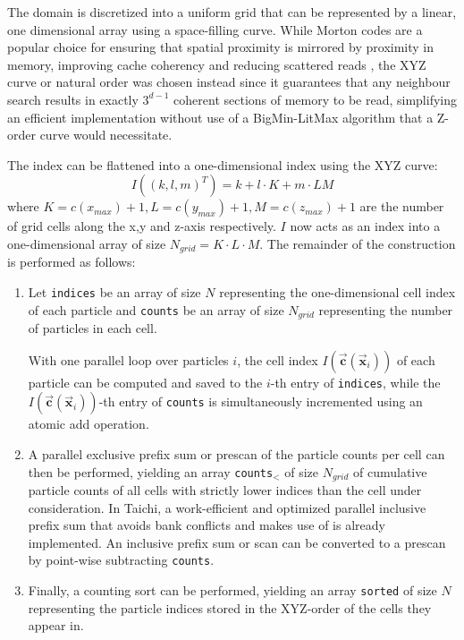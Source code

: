 \documentclass[oneside, a4paper]{book}
\newcommand\vek[1]{\vec{\bm{#1}}}
\newcommand\br[1]{\left(#1\right)}
\begin{document}
\begin{appendices}
    The domain is discretized into a uniform grid that can be represented by a linear, one dimensional array using a space-filling curve. While Morton codes are a popular choice \autocite{compressed-neighbour-lists} for ensuring that spatial proximity is mirrored by proximity in memory, improving cache coherency and reducing scattered reads \autocite{hoetzlein-rama-counting-sort}, the XYZ curve or natural order was chosen instead since it guarantees that any neighbour search results in exactly $3^{d-1}$ coherent sections of memory to be read, simplifying an efficient implementation without use of a BigMin-LitMax algorithm \autocite{bigminlitmax} that a Z-order curve would necessitate.
    
    The index can be flattened into a one-dimensional index using the XYZ curve:
    \begin{equation}\label{eq:counting-sort-xyz}
      I\br{\br{k,l,m}^T} = k + l\cdot K + m\cdot LM
    \end{equation}
    where $K=c(x_{max})+1, L=c(y_{max})+1, M=c(z_{max})+1$ are the  number of grid cells along the x,y and z-axis respectively. $I$ now acts as an index into a one-dimensional array of size $N_{grid} = K\cdot L\cdot M$. The remainder of the construction is performed as follows:
    \begin{enumerate}
      \item Let \texttt{indices} be an array of size $N$ representing the one-dimensional cell index of each particle and \texttt{counts} be an array of size $N_{grid}$ representing the number of particles in each cell.

      With one parallel loop over particles $i$, the cell index $I\br{\vek{c}(\vek{x}_i)}$ of each particle can be computed and saved to the $i$-th entry of \texttt{indices}, while the $I\br{\vek{c}(\vek{x}_i)}$-th entry of \texttt{counts} is simultaneously incremented using an atomic add operation.
      \item A parallel exclusive prefix sum or prescan of the particle counts per cell can then be performed, yielding an array \texttt{counts}$_<$ of size $N_{grid}$ of cumulative particle counts of all cells with strictly lower indices than the cell under consideration. In Taichi, a work-efficient and optimized parallel inclusive prefix sum that avoids bank conflicts \autocite{parallel-prefix-scan} and makes use of \autocite[Blelloch scans]{blelloch-scans} is already implemented. An inclusive prefix sum or scan can be converted to a prescan by point-wise subtracting \texttt{counts}.
      \item Finally, a counting sort can be performed, yielding an array \texttt{sorted} of size $N$ representing the particle indices stored in the XYZ-order of the cells they appear in.
      

\end{enumerate}
\end{appendices}
\end{document}
